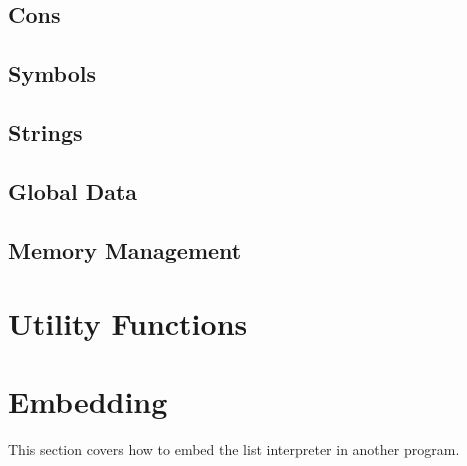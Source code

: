 \documentclass[10pt, openany]{book}
\begin{document}
\subsection{Cons}

\subsection{Symbols}

\subsection{Strings}

\subsection{Global Data}

\subsection{Memory Management}

\section{Utility Functions}

\section{Embedding}
This section covers how to embed the list interpreter in another program.
\end{document}
